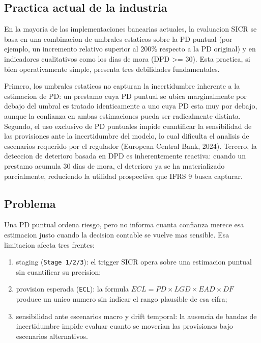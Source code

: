 \documentclass[
  spanish,
  11pt,
  letterpaper,
]{scrbook}
\providecommand{\tightlist}{%
  \setlength{\itemsep}{0pt}\setlength{\parskip}{0pt}}
\theoremstyle{plain}
\theoremstyle{remark}
\begin{document}
\subsection{Practica actual de la industria}\label{sec-p2-industry}

En la mayoria de las implementaciones bancarias actuales, la evaluacion
SICR se basa en una combinacion de umbrales estaticos sobre la PD
puntual (por ejemplo, un incremento relativo superior al 200\% respecto
a la PD original) y en indicadores cualitativos como los dias de mora
(DPD \textgreater= 30). Esta practica, si bien operativamente simple,
presenta tres debilidades fundamentales.

Primero, los umbrales estaticos no capturan la incertidumbre inherente a
la estimacion de PD: un prestamo cuya PD puntual se ubica marginalmente
por debajo del umbral es tratado identicamente a uno cuya PD esta muy
por debajo, aunque la confianza en ambas estimaciones pueda ser
radicalmente distinta. Segundo, el uso exclusivo de PD puntuales impide
cuantificar la sensibilidad de las provisiones ante la incertidumbre del
modelo, lo cual dificulta el analisis de escenarios requerido por el
regulador (European Central Bank, 2024). Tercero, la deteccion de
deterioro basada en DPD es inherentemente reactiva: cuando un prestamo
acumula 30 dias de mora, el deterioro ya se ha materializado
parcialmente, reduciendo la utilidad prospectiva que IFRS 9 busca
capturar.

\subsection{Problema}\label{problema}

Una PD puntual ordena riesgo, pero no informa cuanta confianza merece
esa estimacion justo cuando la decision contable se vuelve mas sensible.
Esa limitacion afecta tres frentes:

\begin{enumerate}
\def\labelenumi{\arabic{enumi}.}
\tightlist
\item
  staging (\texttt{Stage\ 1/2/3}): el trigger SICR opera sobre una
  estimacion puntual sin cuantificar su precision;
\item
  provision esperada (\texttt{ECL}): la formula
  \(ECL = PD \times LGD \times EAD \times DF\) produce un unico numero
  sin indicar el rango plausible de esa cifra;
\item
  sensibilidad ante escenarios macro y drift temporal: la ausencia de
  bandas de incertidumbre impide evaluar cuanto se moverian las
  provisiones bajo escenarios alternativos.
\end{enumerate}
\end{document}
